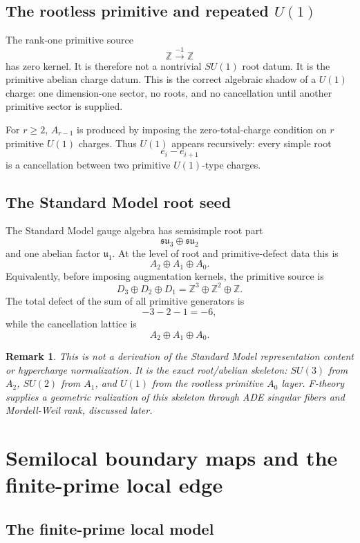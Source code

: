 \documentclass[11pt]{article}
\newtheorem{remark}[theorem]{Remark}
\newcommand{\ZZ}{\mathbb Z}
\begin{document}
\subsection{The rootless primitive and repeated $U(1)$}

The rank-one primitive source
\[
        \ZZ\xrightarrow{-1}\ZZ
\]
has zero kernel.  It is therefore not a nontrivial $SU(1)$ root datum.  It is the primitive abelian charge datum.  This is the correct algebraic shadow of a $U(1)$ charge: one dimension-one sector, no roots, and no cancellation until another primitive sector is supplied.

For $r\ge2$, $A_{r-1}$ is produced by imposing the zero-total-charge condition on $r$ primitive $U(1)$ charges.  Thus $U(1)$ appears recursively: every simple root
\[
        e_i-e_{i+1}
\]
is a cancellation between two primitive $U(1)$-type charges.

\subsection{The Standard Model root seed}

The Standard Model gauge algebra has semisimple root part
\[
        \mathfrak{su}_3\oplus\mathfrak{su}_2
\]
and one abelian factor $\mathfrak u_1$.  At the level of root and primitive-defect data this is
\[
        A_2\oplus A_1\oplus A_0.
\]
Equivalently, before imposing augmentation kernels, the primitive source is
\[
        D_3\oplus D_2\oplus D_1
        =\ZZ^3\oplus\ZZ^2\oplus\ZZ.
\]
The total defect of the sum of all primitive generators is
\[
        -3-2-1=-6,
\]
while the cancellation lattice is
\[
        A_2\oplus A_1\oplus A_0.
\]

\begin{remark}
This is not a derivation of the Standard Model representation content or hypercharge normalization.  It is the exact root/abelian skeleton: $SU(3)$ from $A_2$, $SU(2)$ from $A_1$, and $U(1)$ from the rootless primitive $A_0$ layer.  F-theory supplies a geometric realization of this skeleton through ADE singular fibers and Mordell-Weil rank, discussed later.
\end{remark}

\section{Semilocal boundary maps and the finite-prime local edge}

\subsection{The finite-prime local model}
\end{document}
